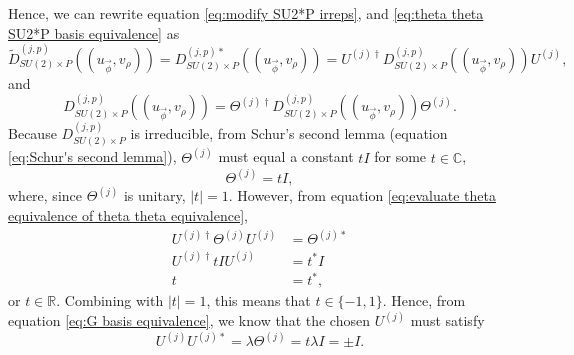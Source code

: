 \documentclass[preprint, 12pt]{revtex4-2}
\numberwithin{equation}{section}
\begin{document}
Hence, we can rewrite equation \ref{eq:modify SU2*P irreps}, and \ref{eq:theta theta SU2*P basis equivalence} as
\begin{equation}\label{eq:modify SU2*P irreps drop p}
    \tilde{D}_{SU(2)\times P}^{(j,p)}((u_{\vec{\phi}}, v_\rho)) = D_{SU(2)\times P}^{(j,p)\ast}((u_{\vec{\phi}}, v_\rho))=U^{(j)\dagger} D_{SU(2)\times P}^{(j,p)}((u_{\vec{\phi}}, v_\rho))U^{(j)},
\end{equation}
and
\begin{equation}\label{eq:theta theta SU2*P basis equivalence drop p}
   D_{SU(2)\times P}^{(j,p)}((u_{\vec{\phi}}, v_\rho)) = \Theta^{(j)\dagger} D_{SU(2)\times P}^{(j,p)}((u_{\vec{\phi}}, v_\rho))\Theta^{(j)}.
\end{equation}
Because $D_{SU(2)\times P}^{(j,p)}$ is irreducible, from Schur's second lemma (equation \ref{eq:Schur's second lemma}), $\Theta^{(j)}$ must equal a constant $t I$ for some $t\in\mathbb{C}$,
\begin{equation}\label{eq:SU2*P basis equivalence}
    \Theta^{(j)} = tI,
\end{equation}
where, since $\Theta^{(j)}$ is unitary, $|t|=1$. However, from equation \ref{eq:evaluate theta equivalence of theta theta equivalence},
\begin{equation}\label{eq:t condition}
    \begin{aligned}
        U^{(j)\dagger}\Theta^{(j)}U^{(j)} &= \Theta^{(j)\ast} \\
        U^{(j)\dagger}tIU^{(j)} &= t^\ast I \\
        t &= t^\ast,
    \end{aligned}
\end{equation}
or $t\in\mathbb{R}$. Combining with $|t|=1$, this means that $t\in\{-1, 1\}$. Hence, from equation \ref{eq:G basis equivalence}, we know that the chosen $U^{(j)}$ must satisfy
\begin{equation}\label{eq:U condition}
    U^{(j)}U^{(j)\ast} = \lambda\Theta^{(j)}=t\lambda I=\pm I.
\end{equation}
\end{document}
